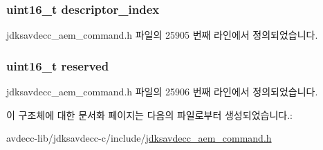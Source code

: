 \subsubsection[{\texorpdfstring{descriptor\+\_\+index}{descriptor_index}}]{\setlength{\rightskip}{0pt plus 5cm}uint16\+\_\+t descriptor\+\_\+index}\hypertarget{structjdksavdecc__aem__command__get__as__path_a042bbc76d835b82d27c1932431ee38d4}{}\label{structjdksavdecc__aem__command__get__as__path_a042bbc76d835b82d27c1932431ee38d4}


jdksavdecc\+\_\+aem\+\_\+command.\+h 파일의 25905 번째 라인에서 정의되었습니다.

\subsubsection[{\texorpdfstring{reserved}{reserved}}]{\setlength{\rightskip}{0pt plus 5cm}uint16\+\_\+t reserved}\hypertarget{structjdksavdecc__aem__command__get__as__path_a5a6ed8c04a3db86066924b1a1bf4dad3}{}\label{structjdksavdecc__aem__command__get__as__path_a5a6ed8c04a3db86066924b1a1bf4dad3}


jdksavdecc\+\_\+aem\+\_\+command.\+h 파일의 25906 번째 라인에서 정의되었습니다.



이 구조체에 대한 문서화 페이지는 다음의 파일로부터 생성되었습니다.\+:\begin{DoxyCompactItemize}
\item 
avdecc-\/lib/jdksavdecc-\/c/include/\hyperlink{jdksavdecc__aem__command_8h}{jdksavdecc\+\_\+aem\+\_\+command.\+h}\end{DoxyCompactItemize}
